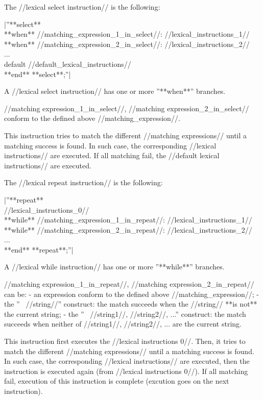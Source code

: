 The //lexical select instruction// is the following:

|''**select**\\ **when** //matching\_expression\_1\_in\_select//: //lexical\_instructions\_1//\\ **when** //matching\_expression\_2\_in\_select//: //lexical\_instructions\_2//\\ ...\\ default //default\_lexical\_instructions//\\ **end** **select**;''|

A //lexical select instruction// has one or more ''**when**'' branches.

//matching expression\_1\_in\_select//, //matching expression\_2\_in\_select// conform to the defined above //matching\_expression//.

This instruction tries to match the different //matching expressions// until a matching success is found. In such case, the corresponding //lexical instructions// are executed. If all matching fail, the //default lexical instructions// are executed.


The //lexical repeat instruction// is the following:

|''**repeat**\\  //lexical\_instructions\_0//\\ **while** //matching\_expression\_1\_in\_repeat//: //lexical\_instructions\_1//\\ **while** //matching\_expression\_2\_in\_repeat//: //lexical\_instructions\_2//\\ ...\\ **end** **repeat**;''|

A //lexical while instruction// has one or more ''**while**'' branches.

//matching expression\_1\_in\_repeat//, //matching expression\_2\_in\_repeat// can be:
  - an expression conform to the defined above //matching\_expression//;
  - the ''~ //string//'' construct: the match succeeds when the //string// **is not** the current string;
  - the ''~ //string1//, //string2//, ...'' construct: the match succeeds when neither of //string1//, //string2//, ... are the current string.

This instruction first executes the //lexical instructions 0//. Then, it tries to match the different //matching expressions// until a matching success is found. In such case, the corresponding //lexical instructions// are executed, then the instruction is executed again (from //lexical instructions 0//). If all matching fail, execution of this instruction is complete (excution goes on the next instruction).

